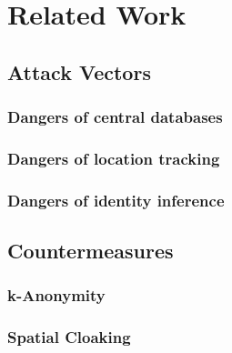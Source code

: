 
\chapter{Related Work}\label{chapter:relatedwork}
\section{Attack Vectors}
\subsection{Dangers of central databases}
\subsection{Dangers of location tracking}
\subsection{Dangers of identity inference}
\section{Countermeasures}
\subsection{k-Anonymity}
\subsection{Spatial Cloaking}

